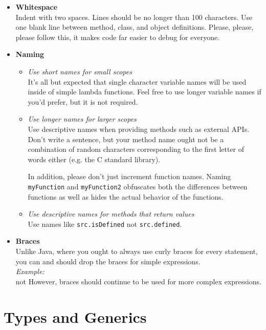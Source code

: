 \begin{itemize}
		\item \textbf{Whitespace}\\
		  Indent with two spaces. Lines should be no longer than 100 characters. Use one
      blank line between method, class, and object definitions. Please, please,
      please follow this, it makes code far easier to debug for everyone.
		\item \textbf{Naming}
		\begin{itemize}
			\item \textit{Use short names for small scopes}\\
			  It's all but expected that single character variable names will be used
        inside of simple lambda functions. Feel free to use longer variable names
        if you'd prefer, but it is not required.
			\item \textit{Use longer names for larger scopes}\\
			  Use descriptive names when providing methods such as external APIs. Don't write
        a sentence, but your method name ought not be a combination of random
        characters corresponding to the first letter of words either (e.g. the C standard
        library).
			\par
			In addition, please don't just increment function names. Naming \texttt{myFunction}
      and \texttt{myFunction2} obfuscates both the differences between functions as well
      as hides the actual behavior of the functions.
			\item \textit{Use descriptive names for methods that return values}\\
			Use names like \texttt{src.isDefined} not \texttt{src.defined}.		
		\end{itemize}
		\item \textbf{Braces}\\
		  Unlike Java, where you ought to always use curly braces for every statement, you
      can and should drop the braces for simple expressions.\\\textit{Example:} \\
		not
		However, braces should continue to be used for more complex expressions.
	\end{itemize}

\section{Types and Generics}

